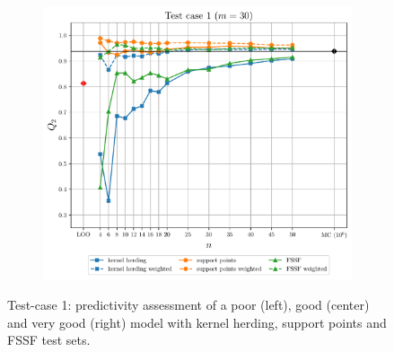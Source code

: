 \begin{landscape}
\begin{figure}
\begin{subfigure}[b]{0.32\linewidth}
    \end{subfigure}
    \centering
    \begin{subfigure}[b]{0.32\linewidth}
      \centering
      \includegraphics[width=\linewidth]{./part2/figures/SIS/irregular_learnsize_30.pdf}
    \end{subfigure}
    \caption{Test-case 1: predictivity assessment of a poor (left), good (center) and very good (right) model with kernel herding, support points and FSSF test sets.}
    \label{fig:irregular_benchmark}
  \end{figure}


\end{landscape}
